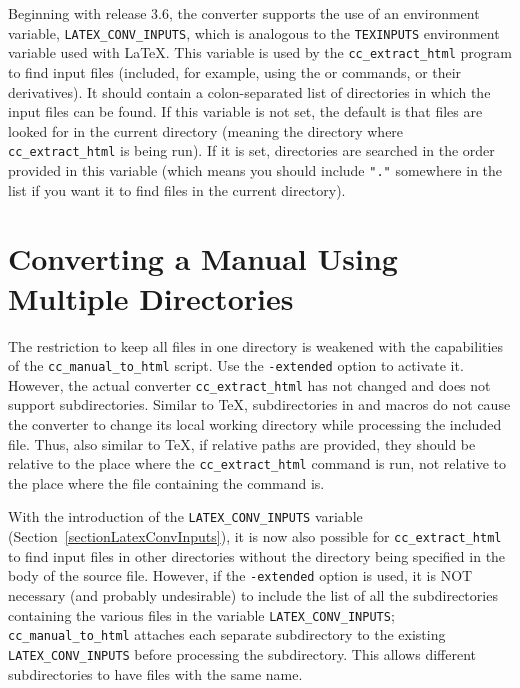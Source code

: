 \documentclass[11pt]{article}
\makeatletter
\newcommand{\Mindex}[1]{\index{#1@\protect\Backslash{\tt #1}}}
\makeatother
\begin{document}
Beginning with release 3.6, the converter supports the use of an 
environment variable, \verb|LATEX_CONV_INPUTS|, which is analogous
to the \verb|TEXINPUTS| environment variable used with \LaTeX.  This
variable is used by the \verb|cc_extract_html| program to find input
files (included, for example, using the \verb|| or \verb|| 
commands, or their derivatives).  It should contain a colon-separated
list of directories in which the input files can be found.  If this variable
is not set, the default is that files are looked for in the current
directory (meaning the directory where \verb|cc_extract_html| is being
run).  If it is set, directories 
are searched in the order provided in this variable (which means you should
include \verb|"."| somewhere in the list if you want it to find files in the
current directory).
\Mindex{input}\Mindex{include}

\section{Converting a Manual Using Multiple Directories}
\label{sectionHtmlExtended}


The restriction to keep all files in one directory is weakened with
the capabilities of the {\tt cc\_manual\_to\_html} script. Use the
{\tt -extended} option to activate it. However, the actual converter
{\tt cc\_extract\_html} has not changed and does not support
subdirectories. Similar to \TeX, subdirectories in \verb++ and
\verb++ macros do not cause the converter to change its
local working directory while processing the included file.  Thus,
also similar to \TeX, if relative paths are provided, they should be
relative to the place where the {\tt cc\_extract\_html} command is
run, not relative to the place where the file containing the command
is.  

With the introduction of the {\tt LATEX\_CONV\_INPUTS} variable 
(Section~\ref{sectionLatexConvInputs}), it is now also possible 
for {\tt cc\_extract\_html} to find input files in other directories 
without the directory being specified in the body of the source file.  
However, if the {\tt -extended} option is used, it is NOT 
necessary (and probably undesirable) to include the list of all the
subdirectories containing the various files in the variable 
{\tt LATEX\_CONV\_INPUTS}; {\tt cc\_manual\_to\_html} attaches each
separate subdirectory to the existing {\tt LATEX\_CONV\_INPUTS} before 
processing the subdirectory.  This allows different subdirectories 
to have files with the same name. 
\end{document}
